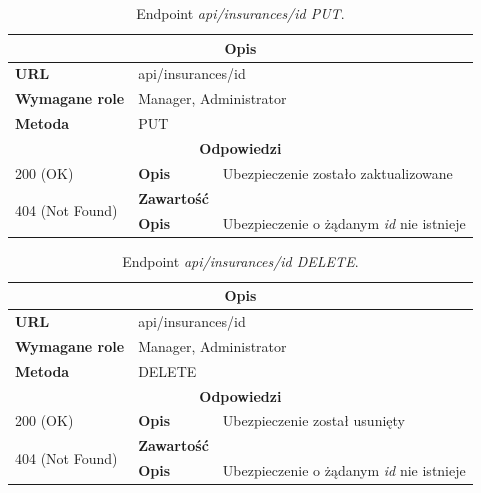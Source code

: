 \documentclass[eng,printmode,openany]{mgr}
\begin{document}
\begin{table}[H]
	\caption{Endpoint \textit{api/insurances/id PUT}.}
	\begin{tabularx}{\textwidth}{|l|l|X|}
		\hline
		\multicolumn{3}{|c|}{\textbf{\textbf{Opis}}}
		\\ \hline
		\textbf{URL}                       & \multicolumn{2}{l|}{api/insurances/id}
		\\ \hline
		\textbf{Wymagane role}             & \multicolumn{2}{l|}{Manager, Administrator}
		\\ \hline
		\textbf{Metoda}                    & \multicolumn{2}{l|}{PUT}
		\\ \hline
		\multicolumn{3}{|c|}{\textbf{Odpowiedzi}}
		\\ \hline
		200 (OK) 		                        & \textbf{Opis}      	& Ubezpieczenie zostało zaktualizowane
		\\ \hline
		\multirow{2}{*}{404 (Not Found)} 	    & \textbf{Zawartość}     & 
		\\ \cline{2-3}                          & \textbf{Opis}          & Ubezpieczenie o żądanym \textit{id} nie istnieje
		\\ \hline
	\end{tabularx}
\end{table}

\begin{table}[H]
	\caption{Endpoint \textit{api/insurances/id DELETE}.}
	\begin{tabularx}{\textwidth}{|l|l|X|}
		\hline
		\multicolumn{3}{|c|}{\textbf{\textbf{Opis}}}
		\\ \hline
		\textbf{URL}                       & \multicolumn{2}{l|}{api/insurances/id}
		\\ \hline
		\textbf{Wymagane role}             & \multicolumn{2}{l|}{Manager, Administrator}
		\\ \hline
		\textbf{Metoda}                    & \multicolumn{2}{l|}{DELETE}
		\\ \hline
		\multicolumn{3}{|c|}{\textbf{Odpowiedzi}}
		\\ \hline
		200 (OK)			                & \textbf{Opis}         	& Ubezpieczenie został usunięty
		\\ \hline
		\multirow{2}{*}{404 (Not Found)} 	& \textbf{Zawartość}     & 
		\\ \cline{2-3}                      & \textbf{Opis}          & Ubezpieczenie o żądanym \textit{id} nie istnieje
		\\ \hline
	\end{tabularx}
\end{table}
\end{document}
